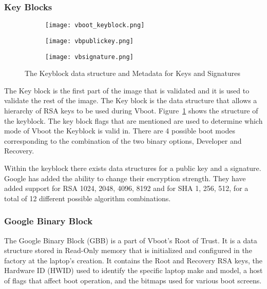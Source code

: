 \documentclass[../report.tex]{subfiles}
\begin{document}
\subsubsection{Key Blocks}

\begin{figure}
\begin{subfigure}{.5\textwidth}
  \centering
  \texttt{[image: vboot\_keyblock.png]}
\end{subfigure}
\begin{subfigure}{.20\textwidth}
  \centering
  \texttt{[image: vbpublickey.png]}
\end{subfigure}
\begin{subfigure}{.20\textwidth}
  \centering
  \texttt{[image: vbsignature.png]}
\end{subfigure}
\caption{The Keyblock data structure and Metadata for Keys and Signatures}
\label{fig:vboot_keyblock}
\end{figure}

The Key block is the first part of the image that is validated and it is used to validate the rest of the image.
The Key block is the data structure that allows a hierarchy of RSA keys to be used during Vboot.
Figure~\ref{fig:vboot_keyblock} shows the structure of the keyblock. 
The key block flags that are mentioned are used to determine which mode of Vboot the Keyblock is valid in. 
There are 4 possible boot modes corresponding to the combination of the two binary options, Developer and Recovery.

Within the keyblock there exists data structures for a public key and a signature.
Google has added the ability to change their encryption strength.
They have added support for RSA 1024, 2048, 4096, 8192 and for SHA 1, 256, 512, for a total of 12 different possible algorithm combinations.

\subsubsection{Google Binary Block}

The Google Binary Block (GBB) is a part of Vboot's Root of Trust.
It is a data structure stored in Read-Only memory that is initialized and configured in the factory at the laptop's creation.
It contains the Root and Recovery RSA keys, the Hardware ID (HWID) used to identify the specific laptop make and model, a host of flags that affect boot operation, and the bitmaps used for various boot screens.
\end{document}
